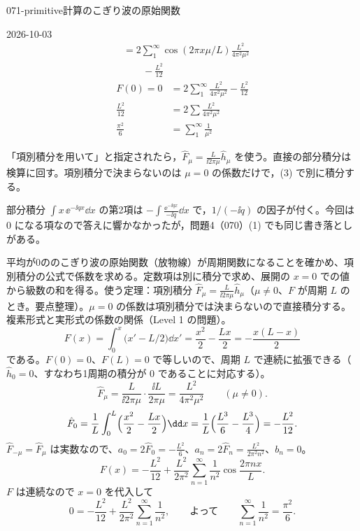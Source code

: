 \documentclass[uplatex,dvipdfmx,a4paper,11pt]{jsarticle}
\begin{document}
\begin{mondai}{071-primitive}{計算}{のこぎり波の原始関数}
\begin{kotaeutsushi}{2026-10-03}
\begin{align*}
  &=2\sum_{1}^{\infty}\cos(2\pi x\mu/L)\frac{L^{2}}{4\pi^{2}\mu^{2}}\\
  &\qquad-\frac{L^{2}}{12}
\end{align*}
\begin{align*}
  F(0)=0&=2\sum_{1}^{\infty}\frac{L^{2}}{4\pi^{2}\mu^{2}}-\frac{L^{2}}{12}\\
  \frac{L^{2}}{12}&=2\sum\frac{L^{2}}{4\pi^{2}\mu^{2}}\\
  \frac{\pi^{2}}{6}&=\sum_{1}^{\infty}\frac{1}{\mu^{2}}
\end{align*}
\end{kotaeutsushi}
\begin{kizuki}
\item 「項別積分を用いて」と指定されたら，$\hat{F}_{\mu}=\frac{L}{\ii2\pi\mu}\hat{h}_{\mu}$ を使う。直接の部分積分は検算に回す。項別積分で決まらないのは $\mu=0$ の係数だけで，(3) で別に積分する。
\item 部分積分 $\int x\,\ee^{-\ii qx}\dd x$ の第2項は $-\int\frac{\ee^{-\ii qx}}{-\ii q}\dd x$ で，$1/(-\ii q)$ の因子が付く。今回は 0 になる項なので答えに響かなかったが，問題4（070）(1) でも同じ書き落としがある。
\end{kizuki}
\begin{tadashii}
\houshin 平均が0ののこぎり波の原始関数（放物線）が周期関数になることを確かめ、項別積分の公式で係数を求める。定数項は別に積分で求め、展開の $x=0$ での値から級数の和を得る。使う定理：項別積分 $\hat{F}_{\mu}=\frac{L}{\ii2\pi\mu}\hat{h}_{\mu}$（$\mu\neq0$、$F$ が周期 $L$ のとき。要点整理）。$\mu=0$ の係数は項別積分では決まらないので直接積分する。複素形式と実形式の係数の関係（Level 1 の問題）。
\keisan
{}
\[
F(x)=\int_{0}^{x}\bigl(x'-L/2\bigr)\dd x'=\frac{x^{2}}{2}-\frac{Lx}{2}=-\frac{x(L-x)}{2}
\]
である。$F(0)=0$、$F(L)=0$ で等しいので、周期 $L$ で連続に拡張できる（$\hat{h}_0=0$、すなわち1周期の積分が $0$ であることに対応する）。
\[
\hat{F}_{\mu}=\frac{L}{\ii2\pi\mu}\cdot\frac{\ii L}{2\pi\mu}=\frac{L^{2}}{4\pi^{2}\mu^{2}}\qquad(\mu\neq0).
\]
\[
\hat{F}_0=\frac{1}{L}\int_{0}^{L}\Bigl(\frac{x^{2}}{2}-\frac{Lx}{2}\Bigr)\dd x=\frac{1}{L}\Bigl(\frac{L^{3}}{6}-\frac{L^{3}}{4}\Bigr)=-\frac{L^{2}}{12}.
\]
 $\hat{F}_{-\mu}=\hat{F}_{\mu}$ は実数なので、$a_0=2\hat{F}_0=-\frac{L^{2}}{6}$、$a_n=2\hat{F}_n=\frac{L^{2}}{2\pi^{2}n^{2}}$、$b_n=0$。
\[
F(x)=-\frac{L^{2}}{12}+\frac{L^{2}}{2\pi^{2}}\sum_{n=1}^{\infty}\frac{1}{n^{2}}\cos\frac{2\pi nx}{L}.
\]
$F$ は連続なので $x=0$ を代入して
\[
0=-\frac{L^{2}}{12}+\frac{L^{2}}{2\pi^{2}}\sum_{n=1}^{\infty}\frac{1}{n^{2}},\qquad\text{よって}\qquad\sum_{n=1}^{\infty}\frac{1}{n^{2}}=\frac{\pi^{2}}{6}.
\]
\end{tadashii}
\end{mondai}
\end{document}
